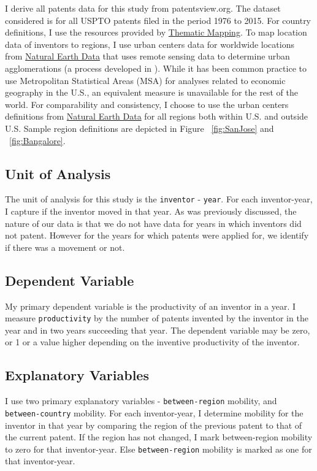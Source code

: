 \documentclass[12pt]{article}
\begin{document}
I derive all patents data for this study from patentsview.org. The dataset considered is for all USPTO patents filed in the period 1976 to 2015. For country definitions, I use the resources provided by \href{http://thematicmapping.org/downloads/world_borders.php}{Thematic Mapping}. To map location data of inventors to regions, I use urban centers data for worldwide locations from \href{http://www.naturalearthdata.com/downloads/10m-cultural-vectors/}{Natural Earth Data} that uses remote sensing data to determine urban agglomerations (a process developed in \cite{Schneider2003}).  While it has been common practice to use Metropolitan Statistical Areas (MSA) for analyses related to economic geography in the U.S., an equivalent measure is unavailable for the rest of the world. For comparability and consistency, I choose to use the urban centers definitions from \href{http://www.naturalearthdata.com/downloads/10m-cultural-vectors/}{Natural Earth Data} for all regions both within U.S. and outside U.S. Sample region definitions are depicted in Figure ~\ref{fig:SanJose} and ~\ref{fig:Bangalore}. 


\subsection{Unit of Analysis}
The unit of analysis for this study is the \verb|inventor| - \verb|year|. For each inventor-year, I capture if the inventor moved in that year. As was previously discussed, the nature of our data is that we do not have data for years in which inventors did not patent. However for the years for which patents were applied for, we identify if there was a movement or not.

\subsection{Dependent Variable}
My primary dependent variable is the productivity of an inventor in a year.  I measure \texttt{productivity} by the number of patents invented by the inventor in the year and in two years succeeding that year. The dependent variable may be zero, or 1 or a value higher depending on the inventive productivity of the inventor.


\subsection{Explanatory Variables}
I use two primary explanatory variables - \texttt{between-region} mobility, and \texttt{between-country} mobility.  For each inventor-year,  I  determine mobility for the inventor in that year by comparing the region  of the previous patent to that of the current patent. If the region has not changed, I mark between-region mobility to zero for that inventor-year. Else \texttt{between-region} mobility is marked as one for that inventor-year.\par
\end{document}
